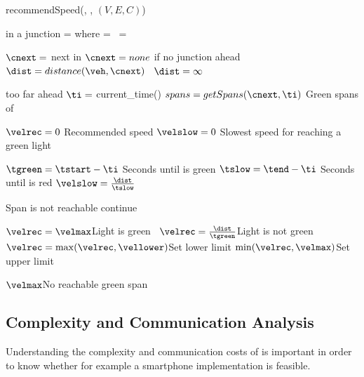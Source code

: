 \begin{algorithm}
\caption{recommendSpeed(\veh, \route, $(V, E, C)$)}\label{alg.recommendedSpeed}
\begin{algorithmic}[1]
 \Comment \veh in a junction\label{alg:recSpeed:injunction}
\State\velmax= \espeed where \eend=\vehposstart
\Else\ \velmax = \vehposspeed
\EndIf\label{alg:recSpeed:injunctionEnd}

\State $\cnext= $ next \con in \route\Comment $\cnext=none$ if no junction ahead \label{alg:recSpeed:cnext}
\ $\dist=distance(\veh,\cnext)$ \label{alg:recSpeed:distance}
\Else\ $\dist = \infty$\label{alg:recSpeed:dinfty}
\EndIf

 \Return \velmax\Comment \cnext too far ahead\label{alg:recSpeed:dmax}
\EndIf
\State $\ti=$ current\_time()\label{alg:recSpeed:ti}
\State $spans = getSpans(\cnext, \ti)$ \Comment Green spans of \cnext \label{alg:recSpeed:getSpan}

\State $\velrec = 0$ \Comment Recommended speed \label{alg:recSpeed:velrec}
\State $\velslow = 0$ \Comment Slowest speed for reaching a green light \label{alg:recSpeed:velslow}

\label{alg:recSpeed:loopSpans}
\State $\tgreen = \tstart - \ti$ \Comment Seconds until \cnextphase is green \label{alg:recSpeed:tg}
\State $\tslow = \tend - \ti$ \Comment Seconds until \cnextphase is red\label{alg:recSpeed:tr}
\State $\velslow = \frac{\dist}{\tslow}$\label{alg:recSpeed:hr}

\State\Comment Span is not reachable
\If{$\velslow > \velmax$} continue\label{alg:recSpeed:continue}
\EndIf

 $\velrec=\velmax$\Comment Light is green\label{alg:recSpeed:green}
\Else\ $\velrec = \frac{\dist}{\tgreen}$\Comment Light is not green\label{alg:recSpeed:h}
\EndIf
\State $\velrec = \max(\velrec, \vellower)$\Comment Set lower limit\label{alg:recSpeed:lowerLimit}
\State\Return $\min(\velrec, \velmax)$\Comment Set upper limit\label{alg:recSpeed:returnh}
\EndFor\label{alg:recSpeed:loopSpansEnd}

\State\Return $\velmax$\Comment No reachable green span\label{alg:recSpeed:returnmax}
\end{algorithmic}
\end{algorithm}

\subsection{Complexity and Communication Analysis}
Understanding the complexity and communication costs of \tech is important in order to know whether for example a smartphone implementation is feasible.

